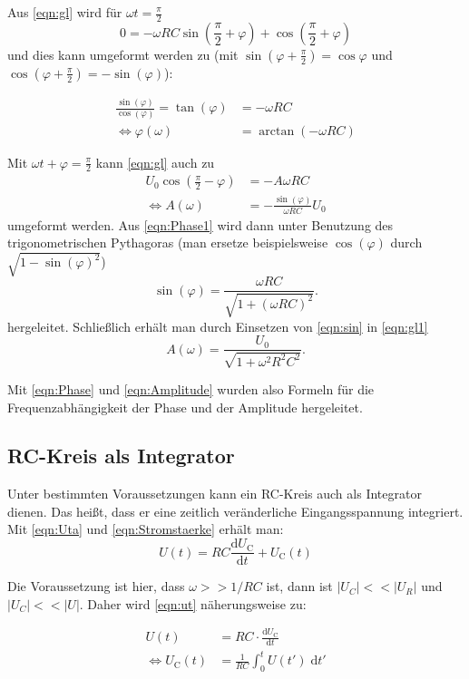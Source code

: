 Aus \autoref{eqn:gl} wird für $\omega t = \frac{\pi}{2}$  
\begin{equation}
    0= - \omega RC \sin(\frac{\pi}{2}+\varphi)+\cos(\frac{\pi}{2}+\varphi)
    \label{eqn:pihalbe}
\end{equation}
und dies kann umgeformt werden zu (mit $\sin(\varphi + \frac{\pi}{2}) = \cos \varphi$ und $\cos(\varphi + \frac{\pi}{2}) = - \sin (\varphi)$):

\begin{align}
    \label{eqn:Phase1}
    \frac{\sin(\varphi)}{\cos(\varphi)} = \tan(\varphi) &= - \omega RC \\
    \iff \varphi(\omega) &= \arctan(- \omega RC)
    \label{eqn:Phase}
\end{align}

Mit $\omega t + \varphi =\frac{\pi}{2}$ kann \autoref{eqn:gl} auch zu 
\begin{align}
        U_0 \cos(\frac{\pi}{2} - \varphi) &= -A  \omega RC \\
        \iff A(\omega) &= - \frac{\sin(\varphi)}{\omega RC} U_0
        \label{eqn:gl1}
    \end{align}
umgeformt werden. Aus \autoref{eqn:Phase1} wird dann unter Benutzung des trigonometrischen Pythagoras (man ersetze beispielsweise $\cos(\varphi)$ durch $\sqrt{1-\sin(\varphi)^2}$)
\begin{equation}
    \sin(\varphi) = \frac{\omega R C}{\sqrt{1 + (\omega RC)^2}}.
    \label{eqn:sin}
\end{equation}
hergeleitet. Schließlich erhält man durch Einsetzen von \autoref{eqn:sin} in \autoref{eqn:gl1}
\begin{equation}
    A(\omega) = \frac{U_0}{\sqrt{1 + \omega^2 R^2 C^2}}.
    \label{eqn:Amplitude}
\end{equation}


Mit \autoref{eqn:Phase} und \autoref{eqn:Amplitude} wurden also Formeln für die Frequenzabhängigkeit der Phase und der Amplitude hergeleitet.

\subsection{RC-Kreis als Integrator}
Unter bestimmten Voraussetzungen kann ein RC-Kreis auch als Integrator dienen. Das heißt, dass er eine zeitlich veränderliche Eingangsspannung integriert. Mit \autoref{eqn:Uta} und \autoref{eqn:Stromstaerke} erhält man:
\begin{equation}
    U(t) = RC \frac{\text{d}U_\text{C}}{\text{d}t} + U_\text{C}(t) 
\label{eqn:ut}
\end{equation} 

Die Voraussetzung ist hier, dass $ω >> 1/RC$ ist, dann ist  $|U_C|<<|U_R|$ und $|U_C|<<|U|$. Daher wird \autoref{eqn:ut} näherungsweise zu:

\begin{align}
U(t) &= RC \cdot \frac{\text{d}U_\text{C}}{\text{d}t} \\
\iff U_\text{C}(t) &= \frac{1}{RC} \int^t_0 U(t') \; \text{d} t'
\end{align}